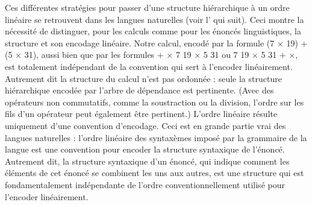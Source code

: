 {    Ces différentes stratégies pour passer d’une structure hiérarchique à un ordre linéaire se retrouvent dans les langues naturelles (voir l’ qui suit). Ceci montre la nécessité de distinguer, pour les calculs comme pour les énoncés linguistiques, la structure et son encodage linéaire. Notre calcul, encodé par la formule (7 \textrm{${\times}$} 19) + (5 \textrm{${\times}$} 31), aussi bien que par les formules + \textrm{${\times}$} 7 19 \textrm{${\times}$} 5 31 ou 7 19 \textrm{${\times}$} 5 31 + \textrm{${\times}$}, est totalement indépendant de la convention qui sert à l’encoder linéairement. Autrement dit la structure du calcul n’est pas ordonnée : seule la structure hiérarchique encodée par l’arbre de dépendance est pertinente. (Avec des opérateurs non commutatifs, comme la soustraction ou la division, l’ordre sur les fils d’un opérateur peut également être pertinent.) L’ordre linéaire résulte uniquement d’une convention d’encodage. Ceci est en grande partie vrai des langues naturelles : l’ordre linéaire des syntaxèmes imposé par la grammaire de la langue est une convention pour encoder la structure syntaxique de l’énoncé. Autrement dit, la structure syntaxique d’un énoncé, qui indique comment les éléments de cet énoncé se combinent les uns aux autres, est une structure qui est fondamentalement indépendante de l’ordre conventionnellement utilisé pour l’encoder linéairement.
}
